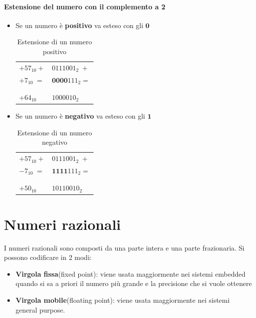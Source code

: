 \documentclass[a4paper]{article}
\theoremstyle{break}
\theoremstyle{break}
\theoremstyle{break}
\theoremstyle{break}
\begin{document}
\paragraph{Estensione del numero con il complemento a 2}
\begin{itemize}
	\item Se un numero è \textbf{positivo} va esteso con gli \( \textbf{0} \)
        \begin{table}[H]
            \begin{center}
                \begin{tabular}{l|l}                                        \\
                    \( +57_{10}+ \)  & \( 0111001_2\;+ \)        \\
                    \( +7_{10}\;= \) & \( \textbf{0000}111_2= \) \\ \\
                    \hline                                       \\
                    \( +64_{10} \)   & \( 1000010_2 \)
                \end{tabular}
            \end{center}
           \caption{Estensione di un numero positivo} 
        \end{table}
	\item Se un numero è \textbf{negativo} va esteso con gli \( \textbf{1} \)
        \begin{table}[H]
            \begin{center}
                \begin{tabular}{l|l}                                        \\
                    \( +57_{10}+ \)  & \( 0111001_2\;+ \)        \\
                    \( -7_{10}\;= \) & \( \textbf{1111}111_2= \) \\ \\
                    \hline                                       \\
                    \( +50_{10} \)   & \( 10110010_2 \)
                \end{tabular}
            \end{center}
            \caption{Estensione di un numero negativo}
        \end{table}
\end{itemize}

\section{Numeri razionali}
I numeri razionali sono composti da una parte intera e una parte frazionaria.
Si possono codificare in 2 modi:
\begin{itemize}
	\item \textbf{Virgola fissa}(fixed point): viene usata maggiormente nei
	      sistemi embedded quando si sa a priori il numero più grande e la
	      precisione che si vuole ottenere
	\item \textbf{Virgola mobile}(floating point): viene usata maggiormente
	      nei sistemi general purpose.
\end{itemize}
\end{document}
